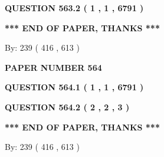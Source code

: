 \documentclass[12pt]{article}
\begin{document}
{\textbf{\Large{QUESTION
563.2 
 ( 1 , 1 , 6791 )
}}}
  
  
   
   
 \vspace{0.2in}
 
   
   
   
   
\vspace{1.0in} 
{\textbf{\large{ *** END OF PAPER, THANKS *** }}} 
   
   
\hspace{1.0in} By: 
 239 ( 416 ,  613 )
   
   
   
   
\newpage 
\setcounter{page}{ 
   564001 } 
   
   
   
   
 {\textbf{ \Large{ PAPER NUMBER  564  }}}
   
   
\vspace{0.2in}
   
   
   
   
   
   
 \vspace{0.2in}
 
 
 
 
   
   
  
\vspace{0.2in}
  
{\textbf{\Large{QUESTION
564.1 
 ( 1 , 1 , 6791 )
}}}
  
  
  
\vspace{0.2in}
  
{\textbf{\Large{QUESTION
564.2 
 ( 2 , 2 , 3 )
}}}
  
  
   
   
 \vspace{0.2in}
 
   
   
   
   
\vspace{1.0in} 
{\textbf{\large{ *** END OF PAPER, THANKS *** }}} 
   
   
\hspace{1.0in} By: 
 239 ( 416 ,  613 )
   
   
   
   
\newpage 
\setcounter{page}{ 
   565001 } 
   
   
   
\end{document}
